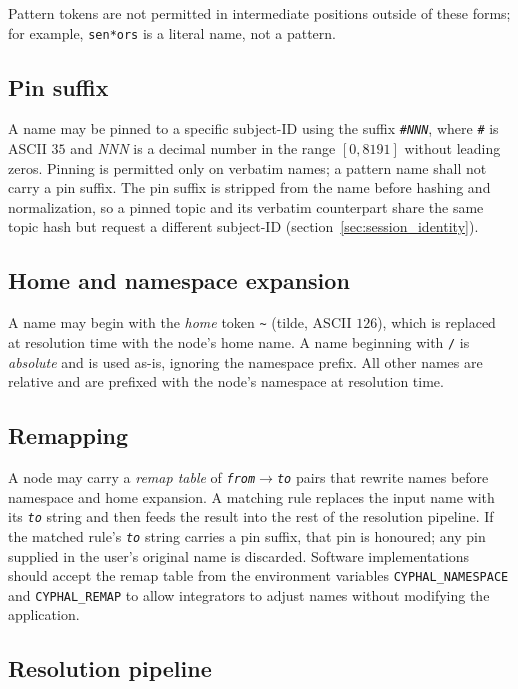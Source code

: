 Pattern tokens are not permitted in intermediate positions outside of these forms;
for example, \texttt{sen*ors} is a literal name, not a pattern.

\subsection{Pin suffix}

A name may be pinned to a specific subject-ID using the suffix
\texttt{\#\textit{NNN}}, where \texttt{\#} is ASCII $35$ and \textit{NNN} is a
decimal number in the range $[0, 8191]$ without leading zeros.
Pinning is permitted only on verbatim names; a pattern name shall not carry a
pin suffix.
The pin suffix is stripped from the name before hashing and normalization, so a
pinned topic and its verbatim counterpart share the same topic hash but request a
different subject-ID (section~\ref{sec:session_identity}).

\subsection{Home and namespace expansion}

A name may begin with the \emph{home} token \texttt{\textasciitilde} (tilde,
ASCII $126$), which is replaced at resolution time with the node's home name.
A name beginning with \texttt{/} is \emph{absolute} and is used as-is, ignoring
the namespace prefix. All other names are relative and are prefixed with the
node's namespace at resolution time.

\subsection{Remapping}

A node may carry a \emph{remap table} of \texttt{\textit{from}}$\to$\texttt{\textit{to}}
pairs that rewrite names before namespace and home expansion.
A matching rule replaces the input name with its \texttt{\textit{to}} string and then
feeds the result into the rest of the resolution pipeline.
If the matched rule's \texttt{\textit{to}} string carries a pin suffix, that pin is
honoured; any pin supplied in the user's original name is discarded.
Software implementations should accept the remap table from the environment variables
\texttt{CYPHAL\_NAMESPACE} and \texttt{CYPHAL\_REMAP} to allow integrators to adjust
names without modifying the application.

\subsection{Resolution pipeline}

